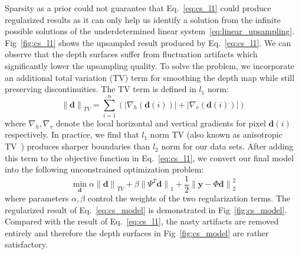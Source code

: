 \documentclass[preprint,10pt,5p,times,twocolumn]{elsarticle}
\begin{document}
Sparsity as a prior could not guarantee that Eq.~\eqref{eq:cs_l1} could produce regularized results as it can only help us identify a solution from the infinite possible solutions of the underdetermined linear system~\eqref{eq:linear_upsampling}. Fig~\ref{fig:cs_l1} shows the upsampled result produced by Eq.~\eqref{eq:cs_l1}. We can observe that the depth surfaces suffer from fluctuation artifacts which significantly lower the upsampling quality. To solve the problem, we incorporate an additional total variation (TV) term for smoothing the depth map while still preserving discontinuities. The TV term is defined in $l_{1}$ norm:
\begin{equation}
\label{eq:tv_l1}
{\|\mathbf{d}\|}_{TV}= \sum_{i=1}^{n}{(|\nabla_{h}(\mathbf{d}(i))|+|\nabla_{v}(\mathbf{d}(i))|)}
\end{equation}
where $\nabla_{h},\nabla_{v}$ denote the local horizontal and vertical gradients for pixel $\mathbf{d}(i)$ respectively. In practice, we find that $l_{1}$ norm TV (also known as anisotropic TV~\cite{GO09}) produces sharper boundaries than $l_{2}$ norm for our data sets. After adding this term to the objective function in Eq.~\eqref{eq:cs_l1}, we convert our final model into the following unconstrained optimization problem:
\begin{equation}
\label{eq:cs_model}
\min_{\mathbf{d}}{\alpha{\|\mathbf{d}\|}_{TV}+\beta{\|\Psi^{T}\mathbf{d}\|}_{1}}+\frac{1}{2}{\|\mathbf{y} - \Phi\mathbf{d}\|}_{2}^{2}
\end{equation}
where parameters $\alpha,\beta$ control the weights of the two regularization terms. The regularized result of Eq.~\eqref{eq:cs_model} is demonstrated in Fig~\ref{fig:cs_model}. Compared with the result of Eq.~\eqref{eq:cs_l1}, the nasty artifacts are  removed entirely and therefore the depth surfaces in Fig~\ref{fig:cs_model} are rather satisfactory.
\end{document}
